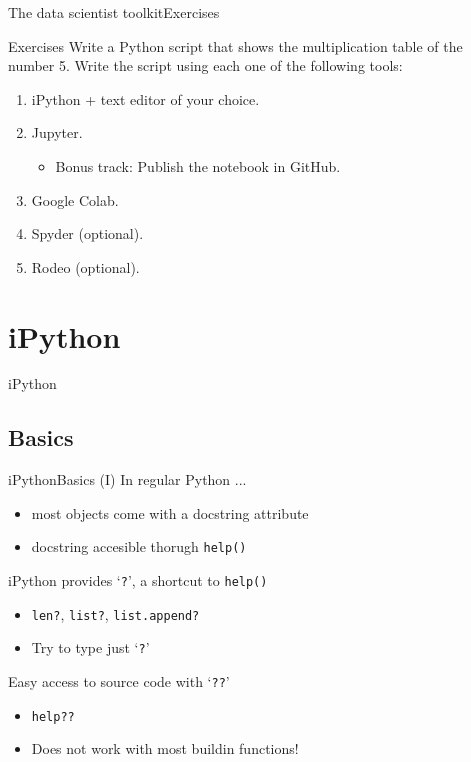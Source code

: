\documentclass[10pt,compress]{beamer} %
\begin{document}
\begin{frame}{The data scientist toolkit}{Exercises}
    \begin{exampleblock}{Exercises}
	Write a Python script that shows the multiplication table of the number 5. Write the script using each one of the following tools:
   	\begin{enumerate}
   	\item iPython + text editor of your choice.
	\item Jupyter. 
            \begin{itemize}
                \item Bonus track: Publish the notebook in GitHub.
            \end{itemize}
	\item Google Colab. 
    	\item Spyder (optional).
	\item Rodeo (optional).
	\end{enumerate}
     \end{exampleblock}
\end{frame}

\section{iPython}
{
\sectionheaderWhite %
\begin{frame}{iPython}
\end{frame}
}

\subsection{Basics}

\begin{frame}{iPython}{Basics (I)}
    In regular Python ...
    \begin{itemize}
        \item most objects come with a docstring attribute
        \item docstring accesible thorugh \texttt{help()}
    \end{itemize}
    iPython provides `\texttt{?}', a shortcut to \texttt{help()}
    \begin{itemize}
        \item \texttt{len?}, \texttt{list?}, \texttt{list.append?}
        \item Try to type just `\texttt{?}'
    \end{itemize}
    Easy access to source code with `\texttt{??}'
    \begin{itemize}
        \item \texttt{help??}
        \item Does not work with most buildin functions!
    \end{itemize}
\end{frame}
\end{document}
